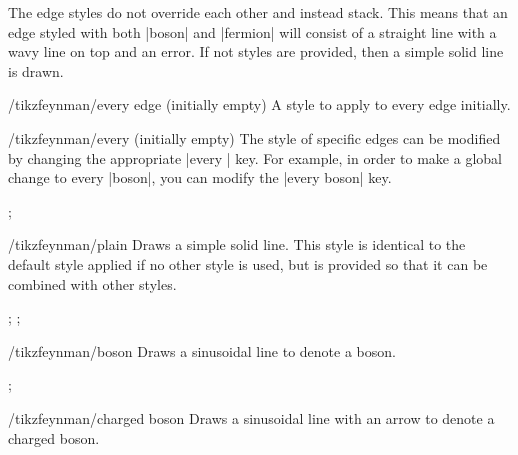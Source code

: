 \documentclass[a4paper,final]{ltxdoc}
\begin{document}
\begin{codeexample}[execute code=false]
The edge styles do not override each other and instead stack.  This means that
an edge styled with both |boson| and |fermion| will consist of a straight line
with a wavy line on top and an error.  If not styles are provided, then a simple
solid line is drawn.

\begin{stylekey}{/tikzfeynman/every edge (initially \normalfont empty)}
  A style to apply to every edge initially.
\end{stylekey}

\begin{stylekey}{/tikzfeynman/every  (initially \normalfont empty)}
  The style of specific edges can be modified by changing the appropriate
  |every | key.  For example, in order to make a global change
  to every |boson|, you can modify the |every boson| key.

\begin{codeexample}[]
;
\end{codeexample}
\end{stylekey}

\begin{key}{/tikzfeynman/plain}
  Draws a simple solid line.  This style is identical to the default style
  applied if no other style is used, but is provided so that it can be combined
  with other styles.

\begin{codeexample}[]
;
;
\end{codeexample}
\end{key}

\begin{key}{/tikzfeynman/boson}
  Draws a sinusoidal line to denote a boson.

\begin{codeexample}[]
;
\end{codeexample}
\end{key}

\begin{key}{/tikzfeynman/charged boson}
  Draws a sinusoidal line with an arrow to denote a charged boson.


\end{key}
\end{codeexample}
\end{document}
